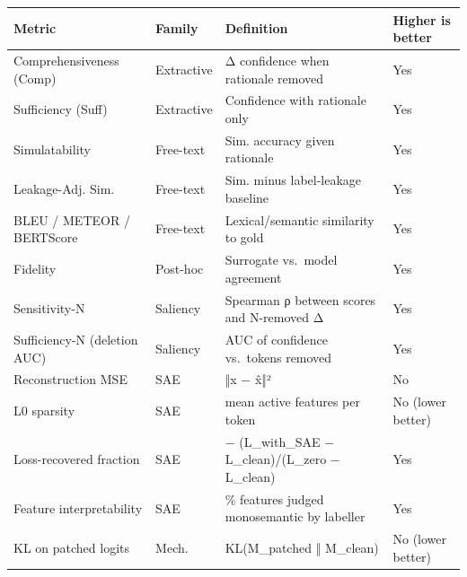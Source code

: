 {\def\LTcaptype{none} %
\begin{longtable}[]{@{}
  >{\raggedright\arraybackslash}p{}
  >{\raggedright\arraybackslash}p{}
  >{\raggedright\arraybackslash}p{}
  >{\raggedright\arraybackslash}p{}@{}}
\toprule\noalign{}
\begin{minipage}[b]{\linewidth}\raggedright
Metric
\end{minipage} & \begin{minipage}[b]{\linewidth}\raggedright
Family
\end{minipage} & \begin{minipage}[b]{\linewidth}\raggedright
Definition
\end{minipage} & \begin{minipage}[b]{\linewidth}\raggedright
Higher is better
\end{minipage} \\
\midrule\noalign{}
\endhead
\bottomrule\noalign{}
\endlastfoot
Comprehensiveness (Comp) & Extractive & Δ confidence when rationale removed & Yes \\
Sufficiency (Suff) & Extractive & Confidence with rationale only & Yes \\
Simulatability & Free-text & Sim. accuracy given rationale & Yes \\
Leakage-Adj. Sim. & Free-text & Sim. minus label-leakage baseline & Yes \\
BLEU / METEOR / BERTScore & Free-text & Lexical/semantic similarity to gold & Yes \\
Fidelity & Post-hoc & Surrogate vs.~model agreement & Yes \\
Sensitivity-N & Saliency & Spearman ρ between scores and N-removed Δ & Yes \\
Sufficiency-N (deletion AUC) & Saliency & AUC of confidence vs.~tokens removed & Yes \\
Reconstruction MSE & SAE & ‖x − x̂‖² & No \\
L0 sparsity & SAE & mean active features per token & No (lower better) \\
Loss-recovered fraction & SAE & 1 − (L\_with\_SAE − L\_clean)/(L\_zero − L\_clean) & Yes \\
Feature interpretability & SAE & \% features judged monosemantic by labeller & Yes \\
KL on patched logits & Mech. & KL(M\_patched ‖ M\_clean) & No (lower better) \\

\end{longtable}}
